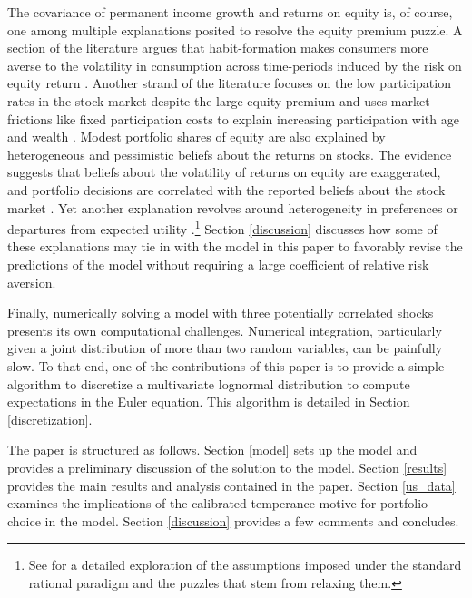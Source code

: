 The covariance of permanent income growth and returns on equity is, of course, one among multiple explanations posited to resolve the equity premium puzzle. A section of the literature argues that habit-formation makes consumers more averse to the volatility in consumption across time-periods induced by the risk on equity return \citep{Constantinides1990, Abel1990, Detemple1991, Campbell1999, Otrok2002}. Another strand of the literature focuses on the low participation rates in the stock market despite the large equity premium and uses market frictions like fixed participation costs to explain increasing participation with age and wealth \citep{Cocco2005, Gomes2005, Alan2006, Khorunzhina2013, Fagereng2017}. Modest portfolio shares of equity are also explained by heterogeneous and pessimistic beliefs about the returns on stocks. The evidence suggests that beliefs about the volatility of returns on equity are exaggerated, and portfolio decisions are correlated with the reported beliefs about the stock market \citep{Dominitz2007, Hurd2011, Amromin2014, Ameriks2020, Mateo2024}. Yet another explanation revolves around heterogeneity in preferences or departures from expected utility \citep{Guvenen2009,Haliassos1995,Haliassos2001, Routledge2010, Schreindorfer2020}.\footnote{See \citet{Barucci2003} for a detailed exploration of the assumptions imposed under the standard rational paradigm and the puzzles that stem from relaxing them.} Section \ref{discussion} discusses how some of these explanations may tie in with the model in this paper to favorably revise the predictions of the model without requiring a large coefficient of relative risk aversion.

Finally, numerically solving a model with three potentially correlated shocks presents its own computational challenges. Numerical integration, particularly given a joint distribution of more than two random variables, can be painfully slow. To that end, one of the contributions of this paper is to provide a simple algorithm to discretize a multivariate lognormal distribution to compute expectations in the Euler equation. This algorithm is detailed in Section \ref{discretization}.

The paper is structured as follows. Section \ref{model} sets up the model and provides a preliminary discussion of the solution to the model. Section \ref{results} provides the main results and analysis contained in the paper. Section \ref{us_data} examines the implications of the calibrated temperance motive for portfolio choice in the model. Section \ref{discussion} provides a few comments and concludes.